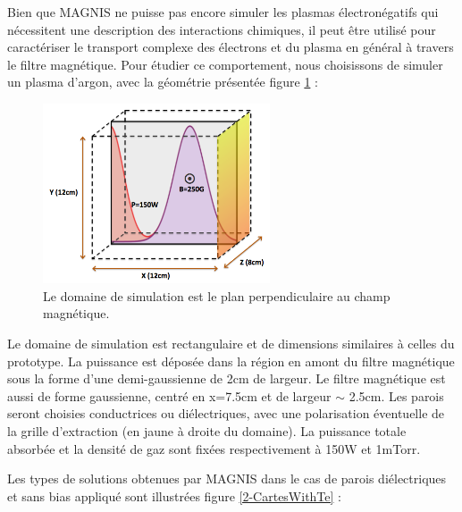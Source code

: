 \begin{refsection}
Bien que MAGNIS ne puisse pas encore simuler les plasmas électronégatifs qui
nécessitent une description des interactions chimiques, il peut être utilisé
pour caractériser le transport complexe des électrons et du plasma en général à
travers le filtre magnétique. Pour étudier ce comportement, nous choisissons de
simuler un plasma d'argon, avec la géométrie présentée figure
\ref{4-pegasesSimDomain} :
\begin{figure}[!htbp]
\centering
\includegraphics[width=0.6\textwidth]{figures/4-pegasesSimDomain.png}
{\caption{Le domaine de simulation est le plan perpendiculaire au champ
magnétique.}
\label{4-pegasesSimDomain}}
\end{figure}

Le domaine de simulation est rectangulaire et de
dimensions similaires à celles du prototype. La puissance est déposée dans la
région en amont du filtre magnétique sous la forme d'une demi-gaussienne de 2cm
de largeur. Le filtre magnétique est aussi de forme gaussienne, centré en
x=7.5cm et de largeur $\sim$ 2.5cm. Les parois seront choisies
conductrices ou diélectriques, avec une polarisation éventuelle de la grille
d'extraction (en jaune à droite du domaine). La puissance totale absorbée et la
densité de gaz sont fixées respectivement à 150W et 1mTorr.

Les types de solutions obtenues par MAGNIS dans le cas de parois diélectriques
et sans bias appliqué sont illustrées figure \ref{2-CartesWithTe} :


\end{refsection}
